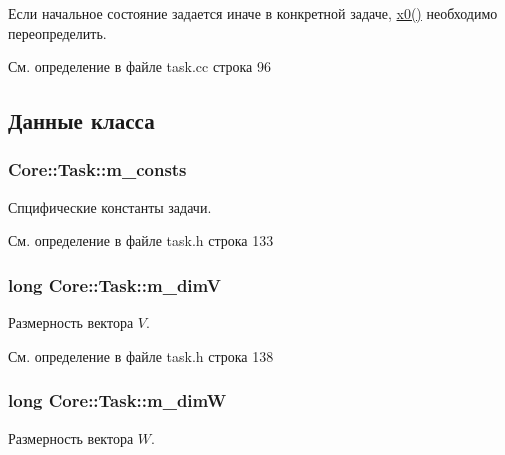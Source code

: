Если начальное состояние задается иначе в конкретной задаче, \hyperlink{class_core_1_1_task_a953cf6c745534e85cb0e36b8294c48ff}{x0()} необходимо переопределить. 

См. определение в файле task.\+cc строка 96



\subsection{Данные класса}
\subsubsection[{\texorpdfstring{m\+\_\+consts}{m_consts}}]{ Core\+::\+Task\+::m\+\_\+consts\hspace{0.3cm}{\ttfamily [protected]}}\hypertarget{class_core_1_1_task_a1482a9a5e2a70c22fa58d2695a680890}{}\label{class_core_1_1_task_a1482a9a5e2a70c22fa58d2695a680890}
Спцифические константы задачи. 

См. определение в файле task.\+h строка 133

\subsubsection[{\texorpdfstring{m\+\_\+dimV}{m_dimV}}]{\setlength{\rightskip}{0pt plus 5cm}long Core\+::\+Task\+::m\+\_\+dimV\hspace{0.3cm}{\ttfamily [protected]}}\hypertarget{class_core_1_1_task_a2b117926018d3463708aa6e8657766b3}{}\label{class_core_1_1_task_a2b117926018d3463708aa6e8657766b3}
Размерность вектора $V$. 

См. определение в файле task.\+h строка 138

\subsubsection[{\texorpdfstring{m\+\_\+dimW}{m_dimW}}]{\setlength{\rightskip}{0pt plus 5cm}long Core\+::\+Task\+::m\+\_\+dimW\hspace{0.3cm}{\ttfamily [protected]}}\hypertarget{class_core_1_1_task_a873b2d4f0d94068f327a18483a4c5318}{}\label{class_core_1_1_task_a873b2d4f0d94068f327a18483a4c5318}
Размерность вектора $W$. 

